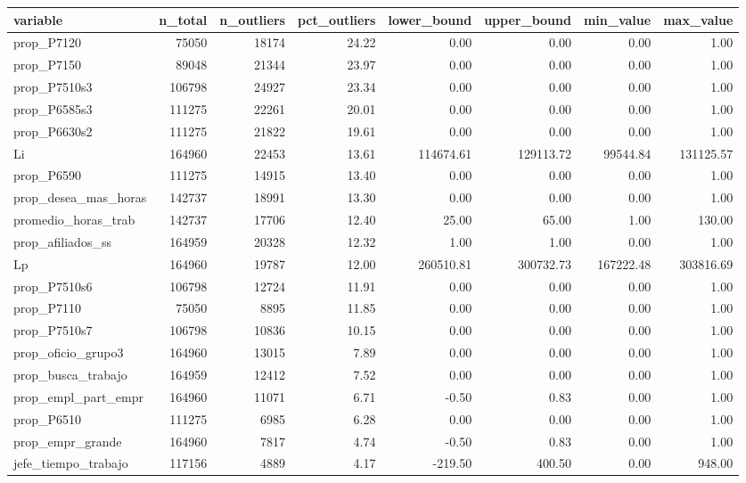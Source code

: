 \begin{table}[ht]
\centering
\begin{tabular}{lrrrrrrr}
  \toprule
variable & n\_total & n\_outliers & pct\_outliers & lower\_bound & upper\_bound & min\_value & max\_value \\ 
  \midrule
prop\_P7120 & 75050 & 18174 & 24.22 & 0.00 & 0.00 & 0.00 & 1.00 \\ 
  prop\_P7150 & 89048 & 21344 & 23.97 & 0.00 & 0.00 & 0.00 & 1.00 \\ 
  prop\_P7510s3 & 106798 & 24927 & 23.34 & 0.00 & 0.00 & 0.00 & 1.00 \\ 
  prop\_P6585s3 & 111275 & 22261 & 20.01 & 0.00 & 0.00 & 0.00 & 1.00 \\ 
  prop\_P6630s2 & 111275 & 21822 & 19.61 & 0.00 & 0.00 & 0.00 & 1.00 \\ 
  Li & 164960 & 22453 & 13.61 & 114674.61 & 129113.72 & 99544.84 & 131125.57 \\ 
  prop\_P6590 & 111275 & 14915 & 13.40 & 0.00 & 0.00 & 0.00 & 1.00 \\ 
  prop\_desea\_mas\_horas & 142737 & 18991 & 13.30 & 0.00 & 0.00 & 0.00 & 1.00 \\ 
  promedio\_horas\_trab & 142737 & 17706 & 12.40 & 25.00 & 65.00 & 1.00 & 130.00 \\ 
  prop\_afiliados\_ss & 164959 & 20328 & 12.32 & 1.00 & 1.00 & 0.00 & 1.00 \\ 
  Lp & 164960 & 19787 & 12.00 & 260510.81 & 300732.73 & 167222.48 & 303816.69 \\ 
  prop\_P7510s6 & 106798 & 12724 & 11.91 & 0.00 & 0.00 & 0.00 & 1.00 \\ 
  prop\_P7110 & 75050 & 8895 & 11.85 & 0.00 & 0.00 & 0.00 & 1.00 \\ 
  prop\_P7510s7 & 106798 & 10836 & 10.15 & 0.00 & 0.00 & 0.00 & 1.00 \\ 
  prop\_oficio\_grupo3 & 164960 & 13015 & 7.89 & 0.00 & 0.00 & 0.00 & 1.00 \\ 
  prop\_busca\_trabajo & 164959 & 12412 & 7.52 & 0.00 & 0.00 & 0.00 & 1.00 \\ 
  prop\_empl\_part\_empr & 164960 & 11071 & 6.71 & -0.50 & 0.83 & 0.00 & 1.00 \\ 
  prop\_P6510 & 111275 & 6985 & 6.28 & 0.00 & 0.00 & 0.00 & 1.00 \\ 
  prop\_empr\_grande & 164960 & 7817 & 4.74 & -0.50 & 0.83 & 0.00 & 1.00 \\ 
  jefe\_tiempo\_trabajo & 117156 & 4889 & 4.17 & -219.50 & 400.50 & 0.00 & 948.00 \\ 

\end{tabular}
\end{table}

